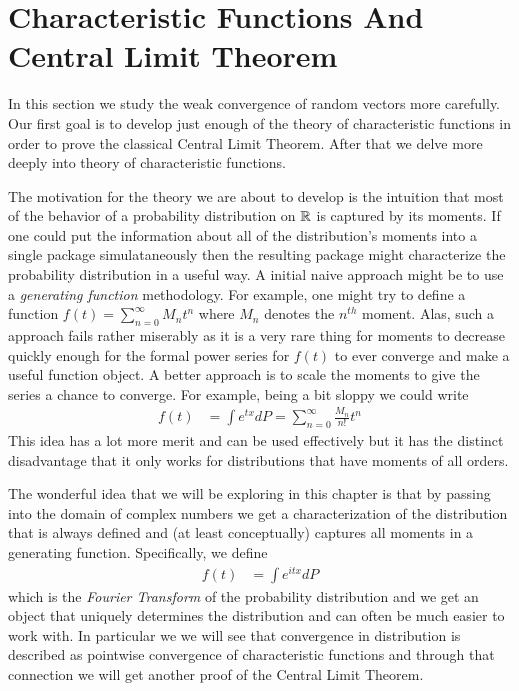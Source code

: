 \section{Characteristic Functions And Central Limit Theorem}
In this section we study the weak convergence of random vectors more carefully.
Our first goal is to develop just enough of the theory of
characteristic functions in order to prove the classical Central Limit Theorem.
After that we delve more deeply into theory of characteristic
functions.  

The motivation for the theory we are about to develop is the intuition
that most of the behavior of a probability distribution on $\mathbb{R}$ is
captured by its moments.  If one could put the information about all
of the distribution's moments into a single package simulataneously
then the resulting package might characterize the probability
distribution in a useful way.  A initial naive approach might be to
use a \emph{generating function} methodology.  For example, one might
try to define a function $f(t) = \sum_{n=0}^\infty M_n t^n$ where
$M_n$ denotes the $n^{th}$ moment.  Alas, such a approach fails rather
miserably as it is a very rare thing for moments to decrease quickly
enough for the formal power series for $f(t)$ to ever converge and make a useful
function object.  A better approach is to scale the moments to give
the series a chance to converge.  For example, being a bit sloppy we
could write
\begin{align*}
f(t) &= \int e^{tx} dP = \sum_{n=0}^\infty \frac{M_n}{n!} t^n
\end{align*}
This idea has a lot more merit and can be used effectively but it has
the distinct disadvantage that it only works for distributions that
have moments of all orders.

The wonderful idea that we will be exploring in this chapter is that
by passing into the domain of complex numbers we get a
characterization of the distribution that is always defined and (at
least conceptually) captures all moments in a generating function.
Specifically, we define 
\begin{align*}
f(t) &= \int e^{itx} dP 
\end{align*}
which is the \emph{Fourier Transform} of the probability distribution
and we get an object that uniquely determines the distribution and can
often be much easier to work with.  In particular we we will see that
convergence in distribution is described as pointwise convergence of
characteristic functions and through that connection we will get
another proof of the Central Limit Theorem.

